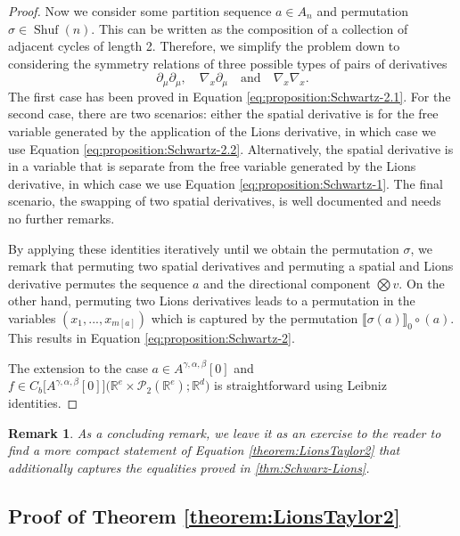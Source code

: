 \documentclass[a4paper,11pt,twoside]{article}
\numberwithin{equation}{section}
\theoremstyle{plain}
\newtheorem{remark}[theorem]{Remark}
\newcommand{\bR}{\mathbb{R}}
\newcommand{\cP}{\mathcal{P}}
\DeclareMathOperator{\Shuf}{Shuf}
\newcommand{\1}{\mathbbm{1}}
\begin{document}
\begin{proof}
		Now we consider some partition sequence $a\in A_n$ and permutation $\sigma \in \Shuf(n)$. This can be written as the composition of a collection of adjacent cycles of length 2. Therefore, we simplify the problem down to considering the symmetry relations of three possible types of pairs of derivatives
		$$
		\partial_\mu \partial_\mu, \quad \nabla_{x} \partial_\mu \quad \mbox{and} \quad \nabla_{x} \nabla_{x}. 
		$$
		The first case has been proved in Equation \eqref{eq:proposition:Schwartz-2.1}. For the second case, there are two scenarios: either the spatial derivative is for the free variable generated by the application of the Lions derivative, in which case we use Equation \eqref{eq:proposition:Schwartz-2.2}. Alternatively, the spatial derivative is in a variable that is separate from the free variable generated by the Lions derivative, in which case we use Equation \eqref{eq:proposition:Schwartz-1}. The final scenario, the swapping of two spatial derivatives, is well documented and needs no further remarks. 
		
		By applying these identities iteratively until we obtain the permutation $\sigma$, we remark that permuting two spatial derivatives and permuting a spatial and Lions derivative permutes the sequence $a$ and the directional component $\bigotimes v$. On the other hand, permuting two Lions derivatives leads to a permutation in the variables $(x_1, ..., x_{m[a]})$ which is captured by the permutation $\llbracket \sigma(a) \rrbracket_0\circ (a)$. This results in Equation \eqref{eq:proposition:Schwartz-2}. 
		
		The extension to the case $a\in A^{\gamma, \alpha, \beta}[0]$ and $f\in C_b\big[ A^{\gamma, \alpha, \beta}[0] \big] \big( \bR^e \times \cP_2(\bR^e); \bR^d\big)$ is straightforward using Leibniz identities. 
	\end{proof}
	
	\begin{remark}
		As a concluding remark, we leave it as an exercise to the reader to find a more compact statement of Equation \eqref{theorem:LionsTaylor2} that additionally captures the equalities proved in \ref{thm:Schwarz-Lions}. 
	\end{remark}
	
	
	\subsection{Proof of Theorem \ref{theorem:LionsTaylor2}}
	
\end{document}

